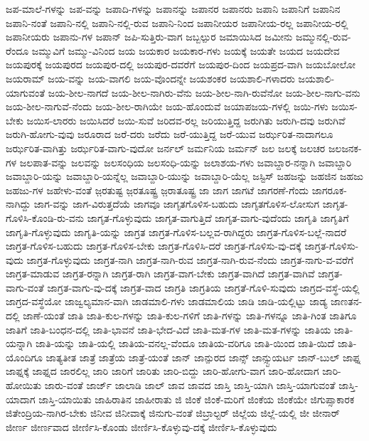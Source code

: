 {ಜಪ-ಮಾಲೆ-ಗಳನ್ನು
ಜಪ-ವನ್ನು
ಜಪಾದಿ-ಗಳನ್ನು
ಜಪಾನನ್ನು
ಜಪಾನರ
ಜಪಾನರು
ಜಪಾನಿ
ಜಪಾನಿಗೆ
ಜಪಾನಿನ
ಜಪಾನಿ-ನಂತೆ
ಜಪಾನಿ-ನಲ್ಲಿ
ಜಪಾನಿ-ನಲ್ಲಿ-ರುವ
ಜಪಾನಿ-ನಿಂದ
ಜಪಾನೀಯರ
ಜಪಾನೀಯ-ರಲ್ಲ
ಜಪಾನೀಯ-ರಲ್ಲಿ
ಜಪಾನೀಯರು
ಜಪಾನು-ಗಳ
ಜಪಾನ್
ಜಪಿ-ಸುತ್ತಿರು-ವಾಗ
ಜಬ್ಬಲ್ಪುರ
ಜಮಾಯಿಸಿದ
ಜಮೀನು
ಜಮ್ಮುನಲ್ಲಿ-ರುವ-ರೆಂದೂ
ಜಮ್ಮುವಿಗೆ
ಜಮ್ಮು-ವಿನಿಂದ
ಜಯ
ಜಯಕಾರ
ಜಯಕಾರ-ಗಳು
ಜಯಕ್ಕೆ
ಜಯತೇ
ಜಯದ
ಜಯದೇವ
ಜಯಪುರಕ್ಕೆ
ಜಯಪುರದ
ಜಯಪುರ-ದಲ್ಲಿ
ಜಯಪುರ-ದವರೆಗೆ
ಜಯಪುರ-ದಿಂದ
ಜಯಪ್ರದ-ವಾಗಿ
ಜಯಬೋಲೋ
ಜಯರಾಮ್
ಜಯ-ವನ್ನು
ಜಯ-ವಾಗಲಿ
ಜಯ-ವೊಂದನ್ನೇ
ಜಯಶಂಕರ
ಜಯಶಾಲಿ-ಗಳಾದರು
ಜಯಶಾಲಿ-ಯಾಗುವಂತೆ
ಜಯ-ಶೀಲ-ನಾಗದೆ
ಜಯ-ಶೀಲ-ನಾಗಿರು-ವೆನು
ಜಯ-ಶೀಲ-ನಾಗಿ-ರುವೆನೋ
ಜಯ-ಶೀಲ-ನಾಗು-ವನು
ಜಯ-ಶೀಲ-ನಾಗುವೆ-ನೆಂದು
ಜಯ-ಶೀಲ-ರಾಗಿಯೇ
ಜಯ-ಹೊಂದುವೆ
ಜಯಾಪಜಯ-ಗಳಲ್ಲಿ
ಜಯಿ-ಗಳು
ಜಯಿಸ-ಬೇಕು
ಜಯಿಸ-ಲಾರರು
ಜಯಿಸಿದರೆ
ಜಯಿ-ಸುವೆ
ಜರಿದವ-ರಲ್ಲ
ಜರಿಯುತ್ತಿದ್ದ
ಜರುಗಿತು
ಜರುಗಿ-ದವು
ಜರುಗಿವೆ
ಜರುಗಿ-ಹೋಗು-ವುವು
ಜರೂರಾದ
ಜರೆ-ದರು
ಜರೆದು
ಜರೆ-ಯುತ್ತಿದ್ದ
ಜರೆ-ಯುವ
ಜರ್ಝರಿತ-ನಾದಾಗಲೂ
ಜರ್ಝರಿತ-ವಾಗಿತ್ತು
ಜರ್ಝರಿತ-ವಾಗು-ವುದೋ
ಜರ್ನಲ್
ಜರ್ಮನಿಯ
ಜರ್ಮನ್
ಜಲ
ಜಲಕ್ಕೆ
ಜಲಚರ
ಜಲಜನಕ-ಗಳ
ಜಲಪಾತ-ವನ್ನು
ಜಲವನ್ನು
ಜಲಸಂಧಿಯ
ಜಲಸಂಧಿ-ಯನ್ನು
ಜಲಾಶಯ-ಗಳು
ಜವಾಬ್ದಾರ-ನನ್ನಾಗಿ
ಜವಾಬ್ದಾರಿ
ಜವಾಬ್ದಾರಿ-ಯನ್ನು
ಜವಾಬ್ದಾರಿ-ಯನ್ನೆಲ್ಲ
ಜವಾಬ್ದಾರಿ-ಯುನ್ನು
ಜವಾಬ್ದಾರಿ-ಯೆಲ್ಲ
ಜಸ್ಟಿಸ್
ಜಹಜನ್ನು
ಜಹಜಿನ
ಜಹಜು
ಜಹಜು-ಗಳ
ಜಹೇಳು-ವಂತೆ
ಜ಼ರತುಷ್ಟ
ಜ಼ರತೂಷ್ಟ್ರ
ಜ಼ರಾತೂಷ್ಟ್ರ
ಜಾ
ಜಾಗ
ಜಾಗಟೆ
ಜಾಗರಣೆ-ಗೆಂದು
ಜಾಗರೂಕ-ನಾಗಿದ್ದು
ಜಾಗ-ವನ್ನು
ಜಾಗ-ವಿರುತ್ತದೆಯೆ
ಜಾಗವೂ
ಜಾಗೃತಗೊಳಿಸ-ಬಹುದು
ಜಾಗೃತಗೊಳಿಸ-ಲೋಸುಗ
ಜಾಗೃತ-ಗೊಳಿಸಿ-ಕೊಂಡಿ-ರು-ವನು
ಜಾಗೃತ-ಗೊಳ್ಳುವುದು
ಜಾಗೃತ-ವಾಗುತ್ತಿದೆ
ಜಾಗೃತ-ವಾಗು-ವುದೆಂದು
ಜಾಗೃತಿ
ಜಾಗೃತಿಗೆ
ಜಾಗೃತಿ-ಗೊಳ್ಳುವುದು
ಜಾಗೃತಿ-ಯನ್ನು
ಜಾಗ್ರತ
ಜಾಗ್ರತ-ಗೊಳಿಸ-ಬಲ್ಲವ-ರಾಗಿದ್ದರು
ಜಾಗ್ರತ-ಗೊಳಿಸ-ಬಲ್ಲೆ-ನಾದರೆ
ಜಾಗ್ರತ-ಗೊಳಿಸ-ಬಹುದು
ಜಾಗ್ರತ-ಗೊಳಿಸ-ಬೇಕು
ಜಾಗ್ರತ-ಗೊಳಿಸಿ-ದರೆ
ಜಾಗ್ರತ-ಗೊಳಿಸು-ವು-ದಕ್ಕೆ
ಜಾಗ್ರತ-ಗೊಳಿಸು-ವುದು
ಜಾಗ್ರತ-ಗೊಳ್ಳುವುದು
ಜಾಗ್ರತ-ನಾಗಿ
ಜಾಗ್ರತ-ನಾಗಿ-ರುವ
ಜಾಗ್ರತ-ನಾಗಿ-ರುವ-ನೆಂದು
ಜಾಗ್ರತ-ನಾಗು-ವ-ವರೆಗೆ
ಜಾಗ್ರತ-ಮಾಡುವ
ಜಾಗ್ರತ-ರನ್ನಾಗಿ
ಜಾಗ್ರತ-ರಾಗಿ
ಜಾಗ್ರತ-ವಾಗ-ಬೇಕು
ಜಾಗ್ರತ-ವಾಗಿದೆ
ಜಾಗ್ರತ-ವಾಗಿವೆ
ಜಾಗ್ರತ-ವಾಗು-ವಂತೆ
ಜಾಗ್ರತ-ವಾಗು-ವು-ದಕ್ಕೆ
ಜಾಗ್ರತ-ವಾದ
ಜಾಗ್ರತಿ
ಜಾಗ್ರತಿಯ
ಜಾಗ್ರತೆ-ಗೊಳಿ-ಸುವುದು
ಜಾಗ್ರದ-ವಸ್ಥೆ-ಯಲ್ಲಿ
ಜಾಗ್ರದ-ವಸ್ಥೆಯೋ
ಜಾಜ್ವಲ್ಯಮಾನ-ವಾಗಿ
ಜಾಡಮಾಲಿ-ಗಳು
ಜಾಡಮಾಲಿಯ
ಜಾಡಿ
ಜಾಡಿ-ಯಲ್ಲಿಟ್ಟು
ಜಾಡ್ಯ
ಜಾಣತನ-ದಲ್ಲಿ
ಜಾಣೆ-ಯಂತೆ
ಜಾತಿ
ಜಾತಿ-ಕುಲ-ಗಳನ್ನು
ಜಾತಿ-ಕುಲ-ಗಳಿಗೆ
ಜಾತಿ-ಗಳನ್ನು
ಜಾತಿ-ಗಳನ್ನೂ
ಜಾತಿ-ಗಿಂತ
ಜಾತಿಗೂ
ಜಾತಿಗೆ
ಜಾತಿ-ಬಂಧನ-ದಲ್ಲಿ
ಜಾತಿ-ಭಾವನೆ
ಜಾತಿ-ಭೇದ-ವಿದೆ
ಜಾತಿ-ಮತ-ಗಳ
ಜಾತಿ-ಮತ-ಗಳನ್ನು
ಜಾತಿಯ
ಜಾತಿ-ಯನ್ನಾಗಿ
ಜಾತಿ-ಯನ್ನು
ಜಾತಿ-ಯಲ್ಲಿ
ಜಾತಿಯ-ವನಲ್ಲ-ವೆಂದೂ
ಜಾತಿಯ-ವರಿಗೂ
ಜಾತಿ-ಯಿಂದ
ಜಾತಿ-ಯಿದೆ
ಜಾತಿ-ಯೊಂದಿಗೂ
ಜಾತ್ಯತೀತ
ಜಾತ್ರೆ
ಜಾತ್ರೆಯ
ಜಾತ್ರೆ-ಯಂತೆ
ಜಾನ್
ಜಾನ್ಪುರದ
ಜಾನ್ಸ್
ಜಾನ್ಸ್ಟುಯರ್ಟ
ಜಾನ್-ಬುಲ್
ಜಾಫ್ನ
ಜಾಫ್ನಕ್ಕೆ
ಜಾಫ್ನದ
ಜಾರಲಿಲ್ಲ
ಜಾರಿ
ಜಾರಿಗೆ
ಜಾರಿತು
ಜಾರಿ-ಬಿದ್ದು
ಜಾರಿ-ಹೋಗು-ವಾಗ
ಜಾರಿ-ಹೋದಾಗ
ಜಾರಿ-ಹೋಯಿತು
ಜಾರು-ವಂತೆ
ಜಾರ್ಜ್
ಜಾಲಾಡಿ
ಜಾಲ್
ಜಾವ
ಜಾವದ
ಜಾಸ್ತಿ
ಜಾಸ್ತಿ-ಯಾಗಿ
ಜಾಸ್ತಿ-ಯಾಗುವಂತೆ
ಜಾಸ್ತಿ-ಯಾದಾಗ
ಜಾಸ್ತಿ-ಯಾಯಿತು
ಜಾಹಿರಾತಿನ
ಜಾಹೀರಾತು
ಜಿ
ಜಿಂಕೆ
ಜಿಂಕೆ-ಮರಿಗೆ
ಜಿಂಕೆಯ
ಜಿಂಕೆಯೇ
ಜಿಗುಪ್ಸಾಕಾರಕ
ಜಿತೇಂದ್ರಿಯ-ನಾಗಿರ-ಬೇಕು
ಜಿನೀವ
ಜಿನೀವಾಕ್ಕೆ
ಜಿನುಗು-ವಂತೆ
ಜಿಬ್ರಾಲ್ಟರ್
ಜಿಲ್ಲೆಯ
ಜಿಲ್ಲೆ-ಯಲ್ಲಿ
ಜೀ
ಜೀನಾರ್
ಜೀರ್ಣ
ಜೀರ್ಣವಾದ
ಜೀರ್ಣಿಸಿ-ಕೊಂಡು
ಜೀರ್ಣಿಸಿ-ಕೊಳ್ಳುವು-ದಕ್ಕೆ
ಜೀರ್ಣಿಸಿ-ಕೊಳ್ಳುವುದು
}
